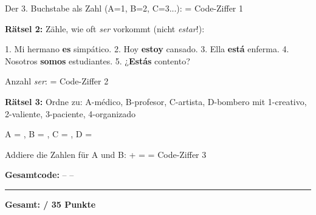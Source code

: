 \documentclass[11pt,a4paper]{article}
\newcommand{\luecke}[1]{\underline{\hspace{#1}}}
\newcommand{\es}[1]{\textit{#1}}
\begin{document}
Der 3. Buchstabe als Zahl (A=1, B=2, C=3...): \fbox{\phantom{XX}} = Code-Ziffer 1

\vspace{0.5em}
\textbf{Rätsel 2:} Zähle, wie oft \es{ser} vorkommt (nicht \es{estar}!):

\vspace{0.3em}
{\small 1. Mi hermano \textbf{es} simpático. 2. Hoy \textbf{estoy} cansado. 3. Ella \textbf{está} enferma. 4. Nosotros \textbf{somos} estudiantes. 5. ¿\textbf{Estás} contento?}

\vspace{0.3em}
Anzahl \es{ser}: \fbox{\phantom{XX}} = Code-Ziffer 2

\vspace{0.5em}
\textbf{Rätsel 3:} Ordne zu: A-médico, B-profesor, C-artista, D-bombero mit 1-creativo, 2-valiente, 3-paciente, 4-organizado

\vspace{0.3em}
A = \luecke{0.8cm}, B = \luecke{0.8cm}, C = \luecke{0.8cm}, D = \luecke{0.8cm}

Addiere die Zahlen für A und B: \luecke{1cm} + \luecke{1cm} = \fbox{\phantom{XX}} = Code-Ziffer 3

\vspace{0.5em}
\textbf{Gesamtcode:} \fbox{\phantom{XX}} -- \fbox{\phantom{XX}} -- \fbox{\phantom{XX}}

\vspace{1em}
\hrule
\vspace{0.3em}
\begin{flushright}
\textbf{Gesamt: \luecke{1cm} / 35 Punkte}
\end{flushright}
\end{document}
